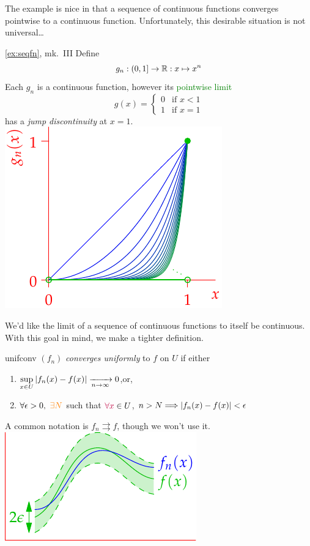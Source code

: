 The example is nice in that a sequence of continuous functions converges pointwise to a continuous function. Unfortunately, this desirable situation is not universal\ldots

\goodbreak

\begin{example*}[lower separated=false, sidebyside, sidebyside align=top seam, sidebyside gap=0pt, righthand width=0.39\linewidth]{\ref{ex:seqfn}, mk.\ III}{}
	Define
	\[
		g_n:(0,1]\to\mathbb{R}: x\mapsto x^n
	\]
	Each $g_n$ is a continuous function, however its \textcolor{Green}{pointwise limit}
	\[
		g(x)=
		\begin{cases}
			0&\text{if }x<1\\
			1&\text{if }x=1
		\end{cases}
	\]
	has a \emph{jump discontinuity} at $x=1$.
	\tcblower
	\flushright\includegraphics[scale=0.95]{seqex3}
\end{example*}

We'd like the limit of a sequence of continuous functions to itself be continuous. With this goal in mind, we make a tighter definition.


\begin{defn}[lower separated=false, sidebyside, sidebyside align=top seam, sidebyside gap=0pt, righthand width=0.32\linewidth]{}{unifconv}
	$(f_n)$ \emph{converges uniformly} to $f$ on $U$ if either
	\begin{enumerate}
	  \item $\displaystyle \sup\limits_{x\in U}\left| f_n(x)-f(x)\right|\xrightarrow[n\to\infty]{}0$,\quad or,
	  \item $\forall \epsilon>0,\ \textcolor{orange}{\exists N}$ such that $\textcolor{purple}{\forall x}\in U$, $n>N\Longrightarrow \left| f_n(x)-f(x)\right|<\epsilon$
	\end{enumerate}
	A common notation is $f_n\rightrightarrows f$, though we won't use it.
	\tcblower
	\flushright\includegraphics[scale=0.95]{unifconv1}
\end{defn}

